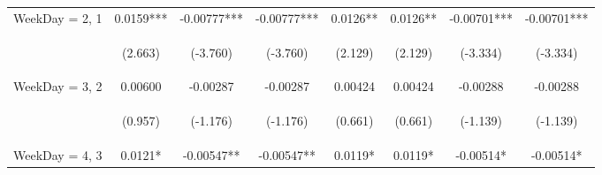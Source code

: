 \documentclass[]{article}
\begin{document}
\begin{center}
\begin{tabular}{lccccccc}
WeekDay = 2, 1 & 0.0159*** & -0.00777*** & -0.00777*** & 0.0126** & 0.0126** & -0.00701*** & -0.00701*** \\
\vspace{4pt} & \begin{footnotesize}(2.663)\end{footnotesize} & \begin{footnotesize}(-3.760)\end{footnotesize} & \begin{footnotesize}(-3.760)\end{footnotesize} & \begin{footnotesize}(2.129)\end{footnotesize} & \begin{footnotesize}(2.129)\end{footnotesize} & \begin{footnotesize}(-3.334)\end{footnotesize} & \begin{footnotesize}(-3.334)\end{footnotesize} \\
WeekDay = 3, 2 & 0.00600 & -0.00287 & -0.00287 & 0.00424 & 0.00424 & -0.00288 & -0.00288 \\
\vspace{4pt} & \begin{footnotesize}(0.957)\end{footnotesize} & \begin{footnotesize}(-1.176)\end{footnotesize} & \begin{footnotesize}(-1.176)\end{footnotesize} & \begin{footnotesize}(0.661)\end{footnotesize} & \begin{footnotesize}(0.661)\end{footnotesize} & \begin{footnotesize}(-1.139)\end{footnotesize} & \begin{footnotesize}(-1.139)\end{footnotesize} \\
WeekDay = 4, 3 & 0.0121* & -0.00547** & -0.00547** & 0.0119* & 0.0119* & -0.00514* & -0.00514* \\

\end{tabular}
\end{center}
\end{document}
